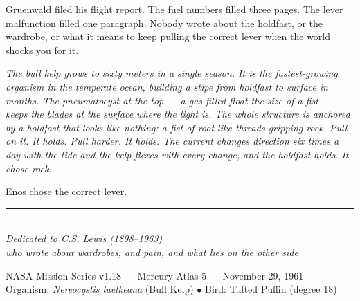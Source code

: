 \documentclass[12pt, letterpaper]{article}
\begin{document}
Gruenwald filed his flight report. The fuel numbers filled three pages. The lever malfunction filled one paragraph. Nobody wrote about the holdfast, or the wardrobe, or what it means to keep pulling the correct lever when the world shocks you for it.

\emph{The bull kelp grows to sixty meters in a single season. It is the fastest-growing organism in the temperate ocean, building a stipe from holdfast to surface in months. The pneumatocyst at the top --- a gas-filled float the size of a fist --- keeps the blades at the surface where the light is. The whole structure is anchored by a holdfast that looks like nothing: a fist of root-like threads gripping rock. Pull on it. It holds. Pull harder. It holds. The current changes direction six times a day with the tide and the kelp flexes with every change, and the holdfast holds. It chose rock.}

Enos chose the correct lever.

\vspace{2em}
\begin{center}
\rule{3cm}{0.4pt}\\[1em]
\textit{Dedicated to C.S. Lewis (1898--1963)\\who wrote about wardrobes, and pain, and what lies on the other side}
\end{center}

\vspace{2em}
\begin{center}
\small
NASA Mission Series v1.18 --- Mercury-Atlas 5 --- November 29, 1961\\
Organism: \textit{Nereocystis luetkeana} (Bull Kelp) $\bullet$ Bird: Tufted Puffin (degree 18)
\end{center}
\end{document}

